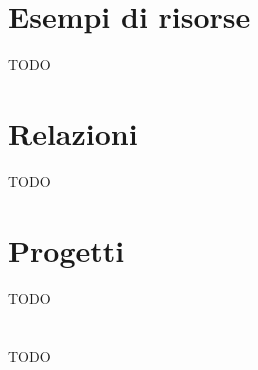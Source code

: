 \documentclass[12pt,a4paper,openright,twoside]{book}
\begin{document}


\tableofcontents   



\chapter{Esempi di risorse}
\label{chap:esempi}
TODO
\chapter{Relazioni}
\label{chap:relazioni}
TODO
\chapter{Progetti}
\label{chap:progetti}
TODO
\chapter{\conclusionsname}
\label{chap:conclusions}
TODO




\end{document}
